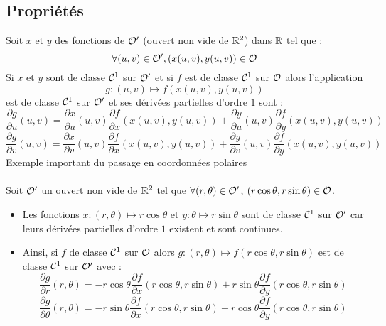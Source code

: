 \subsection{Propriétés}
\begin{prop}
    Soit \(x\) et \(y\) des fonctions de \(\cal{O}'\) (ouvert non vide de \(\R^2\)) dans \(\R\) tel que :
    \[\forall (u, v) \in \cal{O}', (x(u, v), y(u, v)) \in \cal{O}\]
    Si \(x\) et \(y\) sont de classe \(\cal{C}^{1}\) sur \(\cal{O}'\) et si \(f\) est de classe \(\cal{C}^{1}\) sur \(\cal{O}\) alors l’application
    \[g : (u, v) \mapsto f (x(u, v), y(u, v))\]
    est de classe \(\cal{C}^{1}\) sur \(\cal{O}'\) et ses dérivées partielles d’ordre \(1\) sont :
    \[\frac{\partial g}{\partial u}(u, v) = \frac{\partial x}{\partial u}(u, v)\frac{\partial f}{\partial x} (x(u, v), y(u, v)) + \frac{\partial y}{\partial u}(u, v)\frac{\partial f}{\partial y} (x(u, v), y(u, v)) \]
    \[\frac{\partial g}{\partial v} (u, v) = \frac{\partial x}{\partial v} (u, v)\frac{\partial f}{\partial x} (x(u, v), y(u, v)) + \frac{\partial y}{\partial v} (u, v)\frac{\partial f}{\partial y }(x(u, v), y(u, v)) \]
    Exemple important du passage en coordonnées polaires\\~\\
    Soit \(\cal{O}'\) un ouvert non vide de \(\R^2\) tel que \(\forall (r, \theta) \in \cal{O}'\), \((r \cos \theta, r \sin \theta) \in \cal{O}\).
    \begin{itemize}
        \item Les fonctions \(x : (r, \theta) \mapsto r \cos \theta\) et \(y : \theta \mapsto r \sin \theta\) sont de classe \(\cal{C}^{1}\) sur \(\cal{O}'\) car leurs dérivées partielles d’ordre \(1\) existent et sont continues.
        \item Ainsi, si \(f\) de classe \( \cal{C}^{1}\) sur \(\cal{O}\) alors \(g : (r, \theta) \mapsto f (r \cos \theta, r \sin \theta)\) est de classe \(\cal{C}^{1}\) sur \(\cal{O}'\) avec :
        \[ \frac{\partial g}{\partial r} (r, \theta) = -r \cos \theta \frac{\partial f}{\partial x} (r \cos \theta, r \sin \theta) + r \sin \theta \frac{\partial f}{\partial y} (r \cos \theta, r \sin \theta) \]
        \[ \frac{\partial g}{\partial \theta} (r, \theta) = -r \sin \theta \frac{\partial f}{\partial x} (r \cos \theta, r \sin \theta) + r \cos \theta \frac{\partial f}{\partial y }(r \cos \theta, r \sin \theta) \]
    \end{itemize}
\end{prop}
